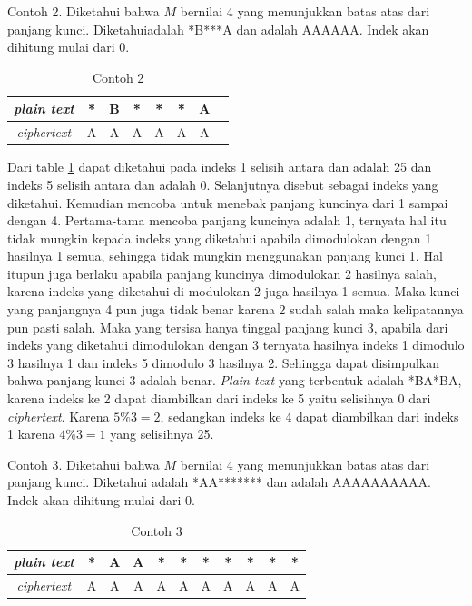 	 
	 Contoh 2. Diketahui bahwa $M$ bernilai 4 yang menunjukkan batas atas dari panjang kunci. Diketahui\plaintext adalah *B***A dan \ciphertext adalah AAAAAA. Indek akan dihitung mulai dari 0. 
	 \begin{table}[H]
	 	\centering
	 	\begin{tabular}{|c|c|c|c|c|c|c|c|}\hline
	 	\textit{plain text}&*&B&*&*&*&A\\ \hline
	 	\textit{ciphertext}&A&A&A&A&A&A\\ \hline
	 	\end{tabular}
	 	\caption{Contoh 2}
	 	\label{tab:contoh2}
	\end{table}
	Dari table \ref{tab:contoh2} dapat diketahui pada indeks 1 selisih antara \plaintext dan \ciphertext adalah 25 dan indeks 5 selisih antara \plaintext dan \ciphertext adalah 0. Selanjutnya disebut sebagai indeks yang diketahui. Kemudian mencoba untuk menebak panjang kuncinya dari 1 sampai dengan 4. Pertama-tama mencoba panjang kuncinya adalah 1, ternyata hal itu tidak mungkin kepada indeks yang diketahui apabila dimodulokan dengan 1 hasilnya 1 semua, sehingga tidak mungkin menggunakan panjang kunci 1. Hal itupun juga berlaku apabila panjang kuncinya dimodulokan 2 hasilnya salah, karena indeks yang diketahui di modulokan 2 juga hasilnya 1 semua. Maka kunci yang panjangnya 4 pun juga tidak benar karena 2 sudah salah maka kelipatannya pun pasti salah. Maka yang tersisa hanya tinggal panjang kunci 3, apabila dari indeks yang diketahui dimodulokan dengan 3 ternyata hasilnya indeks 1 dimodulo 3 hasilnya 1 dan indeks 5 dimodulo 3 hasilnya 2. Sehingga dapat disimpulkan bahwa panjang kunci 3 adalah benar. \textit{Plain text} yang terbentuk adalah *BA*BA, karena indeks ke 2 dapat diambilkan dari indeks ke 5 yaitu  selisihnya 0 dari \textit{ciphertext}. Karena  $5\%3=2$, sedangkan indeks ke 4 dapat diambilkan dari indeks 1 karena $ 4\%3=1 $ yang selisihnya 25. 
	
	
	Contoh 3. Diketahui bahwa $M$ bernilai 4 yang menunjukkan batas atas dari panjang kunci. Diketahui \plaintext adalah *AA******* dan \ciphertext adalah AAAAAAAAAA. Indek akan dihitung mulai dari 0.
	 \begin{table}[H]
	 	\centering
	 	\begin{tabular}{|c|c|c|c|c|c|c|c|c|c|c|}\hline
	 	\textit{plain text}&*&A&A&*&*&*&*&*&*&*\\ \hline
	 	\textit{ciphertext}&A&A&A&A&A&A&A&A&A&A\\ \hline
	 	\end{tabular}
	 	\caption{Contoh 3}
	 	\label{tab:contoh3}
	\end{table}
	
